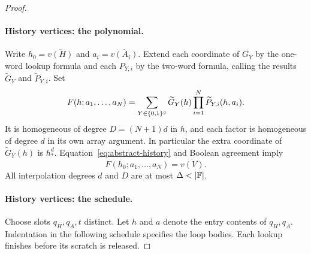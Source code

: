 \begin{proof}
\paragraph{History vertices: the polynomial.}
Write $h_0=\overline{v(H)}$ and $a_i=\overline{v(A_i)}$.  Extend each
coordinate of $\overline{G_Y}$ by the one-word lookup formula and each
$P_{Y,i}$ by the two-word formula, calling the results
$\widetilde G_Y$ and $\widetilde P_{Y,i}$.  Set
\begin{equation}\label{eq:history-polynomial}
 F(h;a_1,\ldots,a_N)
 =\sum_{Y\in\{0,1\}^g}\widetilde G_Y(h)
       \prod_{i=1}^N\widetilde P_{Y,i}(h,a_i).
\end{equation}
It is homogeneous of degree $D=(N+1)d$ in $h$, and each factor is
homogeneous of degree $d$ in its own array argument.  In particular the
extra coordinate of $\widetilde G_Y(h)$ is $h_*^d$.
Equation~\eqref{eq:abstract-history} and Boolean agreement imply
\[
 F(h_0;a_1,\ldots,a_N)=\overline{v(V)}.
\]
All interpolation degrees $d$ and $D$ are at most $\Delta<|\F|$.

\paragraph{History vertices: the schedule.}
Choose slots $q_H,q_A,t$ distinct.  Let $h$ and $a$ denote the entry contents
of $q_H,q_A$.  Indentation in the following schedule specifies the loop
bodies.  Each lookup finishes before its scratch is released.


\end{proof}

